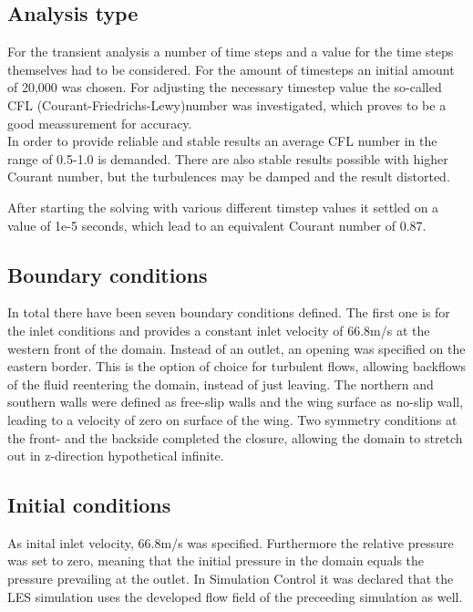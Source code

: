 \subsection{Analysis type}
For the transient analysis a number of time steps and a value for the time steps themselves had to be considered. For the amount of timesteps an initial amount  of 20,000 was chosen. For adjusting the necessary timestep value the so-called CFL (Courant-Friedrichs-Lewy)number was investigated, which proves to be a good meassurement for accuracy.\\
In order to provide reliable and stable results an average CFL number in the range of 0.5-1.0 is demanded. There are also stable results possible with higher Courant number, but the turbulences may be damped and the result distorted.

After starting the solving with various different timstep values it settled on a value of 1e-5 seconds, which lead to an equivalent Courant number of 0.87.
\subsection{Boundary conditions}
In total there have been seven boundary conditions defined. The first one is for the inlet conditions and provides a constant inlet velocity of 66.8m/s at the western front of the domain. Instead of an outlet, an opening was specified on the eastern border. This is the option of choice for turbulent flows, allowing backflows of the fluid reentering the domain, instead of just leaving. The northern and southern walls were defined as free-slip walls and the wing surface as no-slip wall, leading to a velocity of zero on surface of the wing. Two symmetry conditions at the front- and the backside completed the closure, allowing the domain to stretch out in z-direction hypothetical infinite.
\subsection{Initial conditions}
As inital inlet velocity, 66.8m/s was specified. Furthermore the relative pressure was set to zero, meaning that the initial pressure in the domain equals the pressure prevailing at the outlet.
In Simulation Control it was declared that the LES simulation uses the developed flow field of the preceeding simulation as well.
